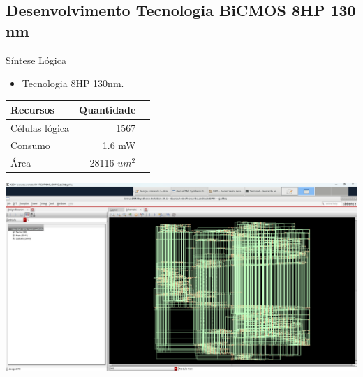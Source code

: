 \documentclass{if-beamer}
\begin{document}
\subsection{Desenvolvimento Tecnologia BiCMOS 8HP 130 nm}
\begin{frame}{Síntese Lógica}
		\begin{minipage}{0.5\textwidth}
		\begin{itemize}
			\item Tecnologia 8HP 130nm.
		\end{itemize}
		\begin{tabular}{|l|r|r|}
			\hline
			Recursos & Quantidade  \\
			\hline
			Células lógica & 1567  \\
			Consumo & 1.6 mW  \\
			Área & 28116 $um^2$  \\
			\hline
		\end{tabular}
		
	\end{minipage}%
	\hspace{0.04\textwidth}
	\begin{minipage}{0.5\textwidth}
		\includegraphics[scale=0.10]{Sintesi-lógica.png}
	\end{minipage}
\end{frame}
\end{document}
